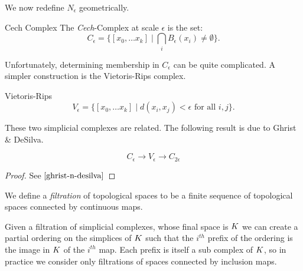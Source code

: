 We now redefine $N_{\epsilon}$ geometrically.
\begin{definition}{Cech Complex}
The \emph{Cech}-Complex at scale $\epsilon$ is the set:
\[ C_\epsilon = \{ [ x_0, \ldots x_k] \mid \bigcap_i B_\epsilon(x_i)  \neq \emptyset \}. \]
\end{definition}
Unfortunately, determining membership in $C_\epsilon$ can be quite complicated. A simpler construction is the 
Vietoris-Rips complex.
\begin{definition}{Vietoris-Rips}
\[ V_\epsilon = \{ [x_0, \ldots x_k] \mid d(x_i, x_j) < \epsilon \textrm{ for all } i,j  \}. \]
\end{definition}

These two simplicial complexes are related. The following result is due to Ghrist \& DeSilva.
\begin{theorem}
\[ C_\epsilon \rightarrow V_\epsilon \rightarrow C_{2\epsilon} \]
\end{theorem}
\begin{proof}
See $\cite{ghrist-n-desilva}$
\end{proof}
\begin{definition}
We define a \emph{filtration} of topological spaces to be a finite sequence of topological spaces connected by
continuous maps.
\end{definition} 
Given a filtration of simplicial complexes, whose final space is $K$ we can create a  
partial ordering on the simplices of $K$ such that the $i^{th}$ prefix of the ordering is the image in $K$ of the $i^{th}$ map. Each prefix is itself a sub complex of $K$, so in practice we consider only filtrations of spaces connected by inclusion maps.

